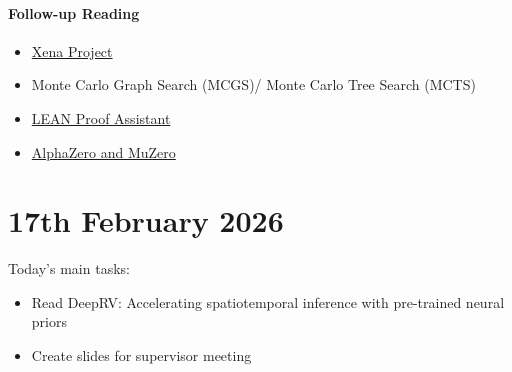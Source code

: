 \documentclass[12pt,a4paper,twoside]{article}
\begin{document}
\begin{paper}
	\paragraph{Follow-up Reading}
	\begin{itemize}
		\item \href{https://xenaproject.wordpress.com/what-is-the-xena-project/}{Xena Project}
		\item Monte Carlo Graph Search (MCGS)/ Monte Carlo Tree Search (MCTS)
		\item \href{https://lean-lang.org/}{LEAN Proof Assistant}
		\item \href{https://deepmind.google/research/alphazero-and-muzero/}{AlphaZero and MuZero}
	\end{itemize}
\end{paper}

\section{17th February 2026}
\begin{summary}
	Today's main tasks:
	\begin{itemize}[leftmargin=*]
		\item Read DeepRV: Accelerating spatiotemporal inference with pre-trained neural priors~\cite{Navott2025}
		\item Create slides for supervisor meeting
	\end{itemize}
\end{summary}
\end{document}
